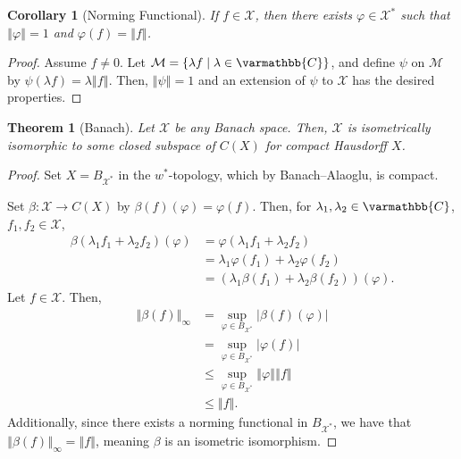 \documentclass[10pt]{extarticle}
\newcommand{\C}{\mathbb{C}}
\newcommand{\norm}[1]{\left\Vert #1\right\Vert}
\newcommand{\set}[1]{\left\{#1\right\}}
\theoremstyle{plain}
\newtheorem*{theorem}{Theorem}
\newtheorem*{corollary}{Corollary}
\theoremstyle{definition}
\theoremstyle{note}
\renewcommand*{\mathbb}[1]{\varmathbb{#1}}
\renewcommand{\newline}{\hfill\break}
\begin{document}
\begin{corollary}[Norming Functional]
  If $f\in \mathcal{X}$, then there exists $\varphi \in \mathcal{X}^{\ast}$ such that $\norm{\varphi} = 1$ and $\varphi(f) = \norm{f}$.
\end{corollary}
\begin{proof}
  Assume $f\neq 0$. Let $\mathcal{M} = \set{\lambda f\mid \lambda \in \C}$, and define $\psi$ on $\mathcal{M}$ by $\psi(\lambda f) = \lambda \norm{f}$. Then, $\norm{\psi} = 1$ and an extension of $\psi$ to $\mathcal{X}$ has the desired properties.
\end{proof}
\begin{theorem}[Banach]
  Let $\mathcal{X}$ be any Banach space. Then, $\mathcal{X}$ is isometrically isomorphic to some closed subspace of $C(X)$ for compact Hausdorff $X$.
\end{theorem}
\begin{proof}
  Set $X = B_{\mathcal{X}^{\ast}}$ in the $w^{\ast}$-topology, which by Banach--Alaoglu, is compact.\newline

  Set $\beta: \mathcal{X}\rightarrow C(X)$ by $\beta(f)(\varphi) = \varphi(f)$. Then, for $\lambda_1,\lambda_2\in \C$, $f_1,f_2\in \mathcal{X}$,
  \begin{align*}
    \beta\left(\lambda_1f_1 + \lambda_2f_2\right)(\varphi) &= \varphi\left(\lambda_1 f_1 + \lambda_2f_2\right)\\
                                                           &= \lambda_1 \varphi(f_1) + \lambda_2\varphi\left(f_2\right)\\
                                                           &= \left(\lambda_1\beta\left(f_1\right) + \lambda_2\beta\left(f_2\right)\right)\left(\varphi\right).
  \end{align*}
  Let $f\in \mathcal{X}$. Then,
  \begin{align*}
    \norm{\beta(f)}_{\infty} &= \sup_{\varphi \in B_{\mathcal{X}^{\ast}}} \left\vert \beta(f)(\varphi) \right\vert\\
                             &= \sup_{\varphi \in B_{\mathcal{X}^{\ast}}}\left\vert \varphi(f) \right\vert\\
                             &\leq \sup_{\varphi \in B_{\mathcal{X}^{\ast}}}\norm{\varphi}\norm{f}\\
                             &\leq \norm{f}.
  \end{align*}
  Additionally, since there exists a norming functional in $B_{\mathcal{X}^{\ast}}$, we have that $\norm{\beta(f)}_{\infty} = \norm{f}$, meaning $\beta$ is an isometric isomorphism.
\end{proof}
\end{document}
